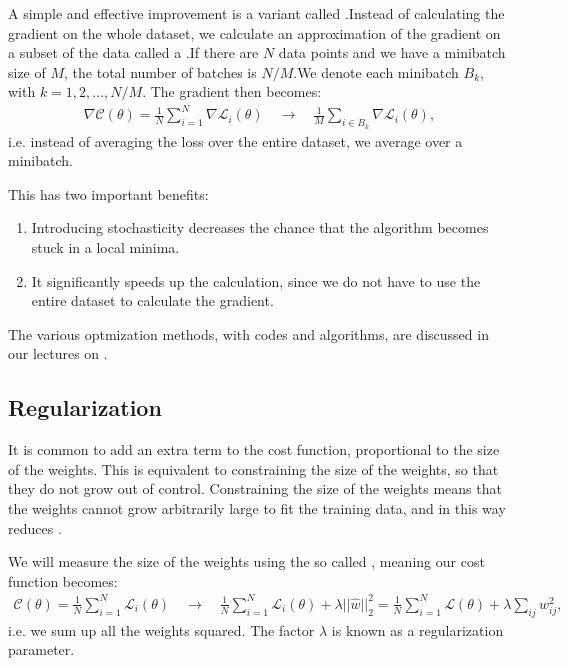 \documentclass[letterpaper,10pt,english]{sphinxmanual}
\begin{document}
A simple and effective improvement is a variant called .Instead of calculating the gradient on the whole dataset, we calculate an approximation of the gradient
on a subset of the data called a .If there are \(N\) data points and we have a minibatch size of \(M\), the total number of batches
is \(N/M\).We denote each minibatch \(B_k\), with \(k = 1, 2,...,N/M\). The gradient then becomes:
\begin{equation*}
\begin{split} \nabla \mathcal{C}(\theta) = \frac{1}{N} \sum_{i=1}^N \nabla \mathcal{L}_i(\theta) \quad \rightarrow \quad
\frac{1}{M} \sum_{i \in B_k} \nabla \mathcal{L}_i(\theta) ,\end{split}
\end{equation*}
i.e. instead of averaging the loss over the entire dataset, we average over a minibatch.

This has two important benefits:
\begin{enumerate}
%
\item {} 
Introducing stochasticity decreases the chance that the algorithm becomes stuck in a local minima.

\item {} 
It significantly speeds up the calculation, since we do not have to use the entire dataset to calculate the gradient.

\end{enumerate}

The various optmization  methods, with codes and algorithms,  are discussed in our lectures on .


\subsection{Regularization}
\label{\detokenize{chapter6:regularization}}
It is common to add an extra term to the cost function, proportional
to the size of the weights.  This is equivalent to constraining the
size of the weights, so that they do not grow out of control.
Constraining the size of the weights means that the weights cannot
grow arbitrarily large to fit the training data, and in this way
reduces .

We will measure the size of the weights using the so called , meaning our cost function becomes:
\begin{equation*}
\begin{split}  \mathcal{C}(\theta) = \frac{1}{N} \sum_{i=1}^N \mathcal{L}_i(\theta) \quad \rightarrow \quad
\frac{1}{N} \sum_{i=1}^N  \mathcal{L}_i(\theta) + \lambda \lvert \lvert \hat{w} \rvert \rvert_2^2 
= \frac{1}{N} \sum_{i=1}^N  \mathcal{L}(\theta) + \lambda \sum_{ij} w_{ij}^2,\end{split}
\end{equation*}
i.e. we sum up all the weights squared. The factor \(\lambda\) is known as a regularization parameter.
\end{document}
